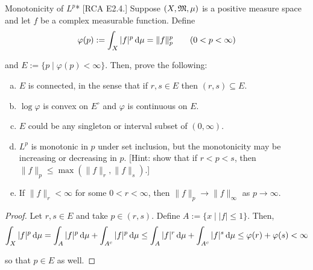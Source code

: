 \begin{problem}{Monotonicity of $L^p$}*
    [RCA E2.4.] Suppose $(X, \mathfrak{M}, \mu)$ is a positive measure space and let $f$ be a complex measurable function. Define 
    $$
        \varphi(p) := \int_X |f|^p \, \mathrm{d}\mu = \|f\|_p^p
        \qquad (0 < p < \infty) 
    $$

    and $E := \{ p \mid \varphi(p) < \infty\}$. Then, prove the following: 
    \begin{enumerate}[(a)]
        \itemsep0em
        \item $E$ is connected, in the sense that if $r, s \in E$ then $(r, s) \subseteq E$. 
        \item $\log \varphi$ is convex on $E^\circ$ and $\varphi$ is continuous on $E$. 
        \item $E$ could be any singleton or interval subset of $(0, \infty)$. 
        \item $L^p$ is monotonic in $p$ under set inclusion, but the monotonicity may be increasing or decreasing in $p$. [Hint: show that if $r < p < s$, then $\|f\|_p \leq \max(\|f\|_r, \|f\|_s)$.]
        \item If $\|f\|_r < \infty$ for some $0 < r < \infty$, then $\|f\|_p \to \|f\|_\infty$ as $p \to \infty$. 
    \end{enumerate}
\end{problem}

\begin{proof}
     Let $r, s \in E$ and take $p \in (r, s)$. Define $A := \{ x \mid |f| \leq 1\}$. Then, 
    $$
        \int_X |f|^p \, \mathrm{d} \mu 
        = \int_{A} |f|^p \, \mathrm{d}\mu + \int_{A^c} |f|^p \, \mathrm{d}\mu
        \leq \int_A |f|^r \, \mathrm{d}\mu + \int_{A^c} |f|^s \, \mathrm{d}\mu
        \leq \varphi(r) + \varphi(s) < \infty
    $$

    so that $p \in E$ as well. 
\end{proof}















